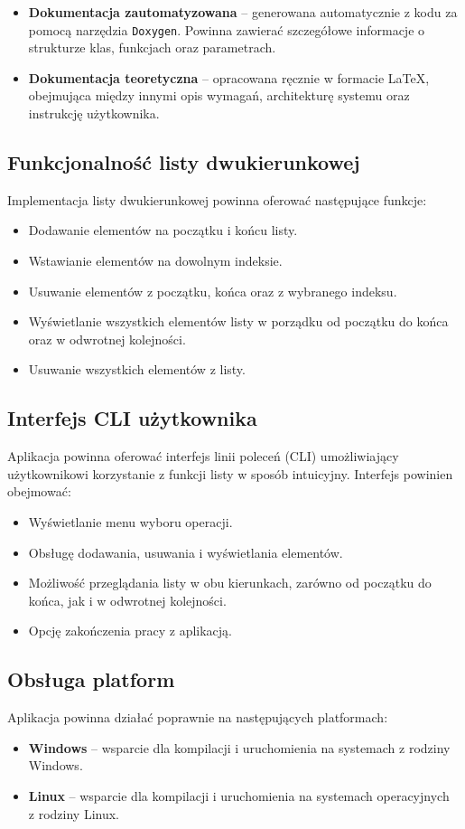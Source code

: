 \begin{itemize}
	\item \textbf{Dokumentacja zautomatyzowana} – generowana automatycznie z kodu za pomocą narzędzia \texttt{Doxygen}. Powinna zawierać szczegółowe informacje o strukturze klas, funkcjach oraz parametrach.
	\item \textbf{Dokumentacja teoretyczna} – opracowana ręcznie w formacie \LaTeX{}, obejmująca między innymi opis wymagań, architekturę systemu oraz instrukcję użytkownika.
\end{itemize}

\subsection{Funkcjonalność listy dwukierunkowej}
Implementacja listy dwukierunkowej powinna oferować następujące funkcje:

\begin{itemize}
	\item Dodawanie elementów na początku i końcu listy.
	\item Wstawianie elementów na dowolnym indeksie.
	\item Usuwanie elementów z początku, końca oraz z wybranego indeksu.
	\item Wyświetlanie wszystkich elementów listy w porządku od początku do końca oraz w odwrotnej kolejności.
	\item Usuwanie wszystkich elementów z listy.
\end{itemize}

\subsection{Interfejs CLI użytkownika}
Aplikacja powinna oferować interfejs linii poleceń (CLI) umożliwiający użytkownikowi korzystanie z funkcji listy w sposób intuicyjny. Interfejs powinien obejmować:

\begin{itemize}
	\item Wyświetlanie menu wyboru operacji.
	\item Obsługę dodawania, usuwania i wyświetlania elementów.
	\item Możliwość przeglądania listy w obu kierunkach, zarówno od początku do końca, jak i w odwrotnej kolejności.
	\item Opcję zakończenia pracy z aplikacją.
\end{itemize}

\subsection{Obsługa platform}
Aplikacja powinna działać poprawnie na następujących platformach:

\begin{itemize}
	\item \textbf{Windows} – wsparcie dla kompilacji i uruchomienia na systemach z rodziny Windows.
	\item \textbf{Linux} – wsparcie dla kompilacji i uruchomienia na systemach operacyjnych \\ z rodziny Linux.
\end{itemize}
